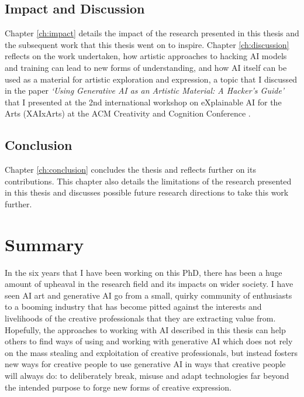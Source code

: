 \subsection{Impact and Discussion}

Chapter \ref{ch:impact} details the impact of the research presented in this thesis and the subsequent work that this thesis went on to inspire. Chapter \ref{ch:discussion} reflects on the work undertaken, how artistic approaches to hacking AI models and training can lead to new forms of understanding, and how AI itself can be used as a material for artistic exploration and expression, a topic that I discussed in the paper \textit{`Using Generative AI as an Artistic Material: A Hacker's Guide'} that I presented at the 2nd international workshop on eXplainable AI for the Arts (XAIxArts) at the ACM Creativity and Cognition Conference \citep{broad2024using}.

\subsection{Conclusion}

Chapter \ref{ch:conclusion} concludes the thesis and reflects further on its contributions.
This chapter also details the limitations of the research presented in this thesis and discusses possible future research directions to take this work further.

\section{Summary}

In the six years that I have been working on this PhD, there has been a huge amount of upheaval in the research field and its impacts on wider society. 
I have seen AI art and generative AI go from a small, quirky community of enthusiasts to a booming industry that has become pitted against the interests and livelihoods of the creative professionals that they are extracting value from.
Hopefully, the approaches to working with AI described in this thesis can help others to find ways of using and working with generative AI which does not rely on the mass stealing and exploitation of creative professionals, but instead fosters new ways for creative people to use generative AI in ways that creative people will always do: to deliberately break, misuse and adapt technologies far beyond the intended purpose to forge new forms of creative expression.
